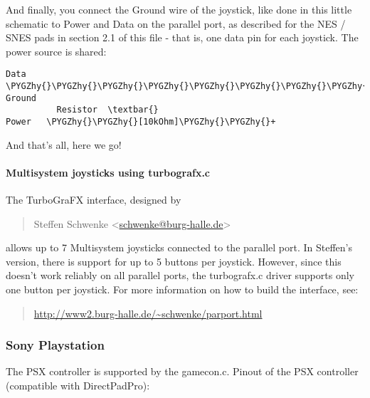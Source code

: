 \documentclass[a4paper,8pt,english]{sphinxmanual}
\def\PYGZgt{\char`\>}
\def\PYGZhy{\char`\-}
\begin{document}
And finally, you connect the Ground wire of the joystick, like done in
this little schematic to Power and Data on the parallel port, as described
for the NES / SNES pads in section 2.1 of this file - that is, one data pin
for each joystick. The power source is shared:

\begin{Verbatim}[commandchars=\\\{\}]
Data    \PYGZhy{}\PYGZhy{}\PYGZhy{}\PYGZhy{}\PYGZhy{}\PYGZhy{}\PYGZhy{}\PYGZhy{}\PYGZhy{}\PYGZhy{}\PYGZhy{}\PYGZhy{}+\PYGZhy{}\PYGZhy{}\PYGZhy{}\PYGZhy{}\PYGZhy{}\PYGZgt{} Ground
          Resistor  \textbar{}
Power   \PYGZhy{}\PYGZhy{}[10kOhm]\PYGZhy{}\PYGZhy{}+
\end{Verbatim}

And that's all, here we go!


\paragraph{Multisystem joysticks using turbografx.c}
\label{input/devices/joystick-parport:multisystem-joysticks-using-turbografx-c}
The TurboGraFX interface, designed by
\begin{quote}

Steffen Schwenke \textless{}\href{mailto:schwenke@burg-halle.de}{schwenke@burg-halle.de}\textgreater{}
\end{quote}

allows up to 7 Multisystem joysticks connected to the parallel port. In
Steffen's version, there is support for up to 5 buttons per joystick.  However,
since this doesn't work reliably on all parallel ports, the turbografx.c driver
supports only one button per joystick. For more information on how to build the
interface, see:
\begin{quote}

\href{http://www2.burg-halle.de/~schwenke/parport.html}{http://www2.burg-halle.de/\textasciitilde{}schwenke/parport.html}
\end{quote}


\subsubsection{Sony Playstation}
\label{input/devices/joystick-parport:sony-playstation}
The PSX controller is supported by the gamecon.c. Pinout of the PSX
controller (compatible with DirectPadPro):
\end{document}
